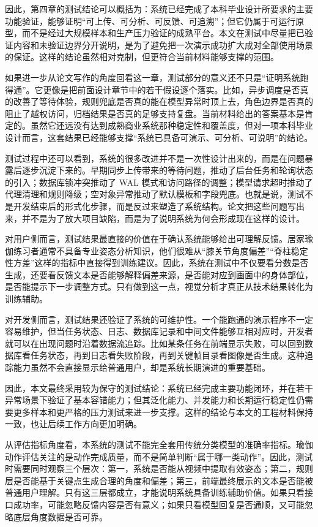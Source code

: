 \documentclass[UTF8,twoside]{ctexrep}
\makeatletter
\def@NAT@last@yr{\@citea}%
\def@NAT@last@yr{-\NAT@penalty}%
\makeatother
\begin{document}
因此，第四章的测试结论可以概括为：系统已经完成了本科毕业设计所要求的主要功能验证，能够证明“可上传、可分析、可反馈、可追溯”；但它仍属于可运行原型，而不是经过大规模样本和生产压力验证的成熟平台。本文在测试中尽量把已验证内容和未验证边界分开说明，是为了避免把一次演示成功扩大成对全部使用场景的保证。这样的结论虽然相对克制，但更符合当前材料能够支撑的范围。

如果进一步从论文写作的角度回看这一章，测试部分的意义还不只是“证明系统跑得通”。它更像是把前面设计章节中的若干假设逐个落实。比如，异步调度是否真的改善了等待体验，规则兜底是否真的能在模型异常时顶上去，角色边界是否真的阻止了越权访问，归档结果是否真的足够支持复盘。当前材料给出的答案基本是肯定的。虽然它还远没有达到成熟商业系统那种稳定性和覆盖度，但对一项本科毕业设计而言，这套结果已经能够支撑“系统已具备可演示、可分析、可说明”的结论。

测试过程中还可以看到，系统的很多改进并不是一次性设计出来的，而是在问题暴露后逐步沉淀下来的。早期同步上传带来的等待问题，推动了后台任务和轮询状态的引入；数据库锁冲突推动了 WAL 模式和访问路径的调整；模型请求超时推动了代理清理和规则降级；空对象异常推动了默认模板和字段兜底。也就是说，测试不是开发结束后的形式化步骤，而是反过来塑造了系统结构。论文把这些问题写出来，并不是为了放大项目缺陷，而是为了说明系统为何会形成现在这样的设计。

对用户侧而言，测试结果最直接的价值在于确认系统能够给出可理解反馈。居家瑜伽练习者通常不具备专业姿态分析知识，他们很难从“膝关节角度偏差”“脊柱稳定性方差”这样的指标中直接得到训练建议。因此，系统在测试中不仅要看分数是否生成，还要看反馈文本是否能够解释偏差来源，是否能对应到画面中的身体部位，是否能提示下一步调整方式。只有做到这一点，视觉分析才真正从技术结果转化为训练辅助。

对开发侧而言，测试结果还验证了系统的可维护性。一个能跑通的演示程序不一定容易维护，但当任务状态、日志、数据库记录和中间文件能够互相对应时，开发者就可以在出现问题时沿着数据流追踪。比如某条任务在前端显示失败，可以回到数据库看任务状态，再到日志看失败阶段，再到关键帧目录看图像是否生成。这种追踪能力虽然不会直接显示给普通用户，却是系统长期演进的重要基础。

因此，本文最终采用较为保守的测试结论：系统已经完成主要功能闭环，并在若干异常场景下验证了基本容错能力；但其泛化能力、并发能力和长期运行稳定性仍需要更多样本和更严格的压力测试来进一步支撑。这样的结论与本文的工程材料保持一致，也让后续工作方向更加明确。

从评估指标角度看，本系统的测试不能完全套用传统分类模型的准确率指标。瑜伽动作评估关注的是动作完成质量，而不是简单判断“属于哪一类动作”。因此，测试时需要同时观察三个层次：第一，系统是否能从视频中提取有效姿态；第二，规则层是否能基于关键点生成合理的角度和偏差；第三，前端最终展示的文本是否能被普通用户理解。只有这三层都成立，才能说明系统具备训练辅助价值。如果只看接口成功率，可能忽略反馈内容是否有意义；如果只看模型回复是否通顺，又可能忽略底层角度数据是否可靠。
\end{document}
